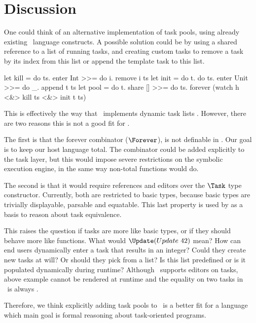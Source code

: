 
\section{Discussion}
\label{sec:discussion}


One could think of an alternative implementation of task pools,
using already existing \TOPHAT\ language constructs.
A possible solution could be by using a shared reference to a list of running tasks,
and creating custom tasks to remove a task by its index from this list
or append the template task to this list.
\begin{TASK}
  let kill = do ts. enter Int >>= do i. remove i ts
  let init = do t. do ts. enter Unit >>= do _. append t ts
  let pool = do t.
    share [] >>= do ts.
    forever (watch h <&> kill ts <&> init t ts)
\end{TASK}

This is effectively the way that \ITASKS\ implements dynamic task lists \cite{conf/pepm/PlasmeijerAKLNG11}.
However, there are two reasons this is not a good fit for \TOPHAT.

The first is that the forever combinator ($\Forever$), is not definable in \TOPHAT.
Our goal is to keep our host language total.
The combinator could be added explicitly to the task layer,
but this would impose severe restrictions on the symbolic execution engine,
in the same way non-total functions would do.

The second is that it would require references and editors over the $\Task$ type constructor.
Currently, both are restricted to basic types,
because basic types are trivially displayable, parsable and equatable.
This last property is used by \cite{Klijnsma2020} as a basis to reason about task equivalence.

This raises the question if tasks are more like basic types, or if they should behave more like functions.
What would $\Update (Update\ 42)$ mean?
How can end users dynamically enter a task that results in an integer?
Could they create new tasks at will?
Or should they pick from a list?
Is this list predefined or is it populated dynamically during runtime?
Although \ITASKS\ supports editors on tasks,
above example cannot be rendered at runtime and the equality on two tasks in \ITASKS\ is always .

Therefore, we think explicitly adding task pools to \TOPHAT\ is a better fit for a language which main goal is formal reasoning about task-oriented programs.
